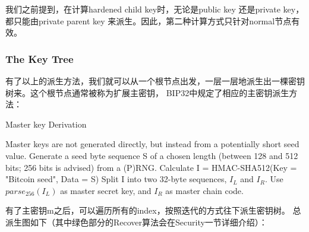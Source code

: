 我们之前提到，在计算hardened child key时，无论是public key 还是private key，都只能由private parent key 来派生。因此，第二种计算方式只针对normal节点有效。


\subsubsection{The Key Tree}
有了以上的派生方法，我们就可以从一个根节点出发，一层一层地派生出一棵密钥树来。这个根节点通常被称为扩展主密钥，
BIP32中规定了相应的主密钥派生方法：

\begin{algorithm}[tbp]\footnotesize
\caption{Master key Derivation}
  	\begin{algorithmic}[1]
	    \STATE Master keys are not generated directly, but instead from a potentially 
	    short seed value.
		\STATE Generate a seed byte sequence S of a chosen length (between 128 and 512 bits; 
		256 bits is advised) from a (P)RNG.
		\STATE Calculate I = HMAC-SHA512(Key = "Bitcoin seed", Data = S)
		\STATE Split I into two 32-byte sequences, $I_L$ and $I_R$.
		\STATE Use $parse_{256}(I_L)$ as master secret key, and $I_R$ as master chain code.
    \end{algorithmic}
\end{algorithm}

有了主密钥m之后，可以遍历所有的index，按照迭代的方式往下派生密钥树。
总派生图如下（其中绿色部分的Recover算法会在Security一节详细介绍）：

